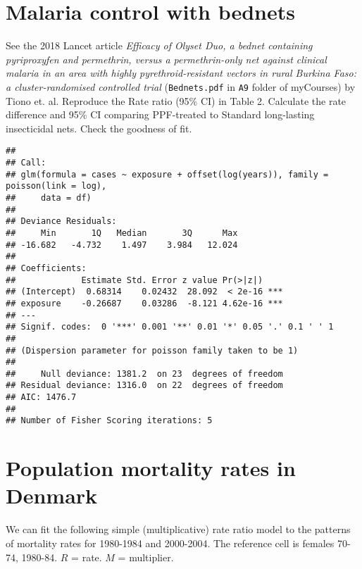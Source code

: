 \documentclass[landscape,twocolumn,letterpaper,9pt,reqno]{article}\usepackage[]{graphicx}\usepackage[]{color}
\newenvironment{knitrout}{}{} %
\begin{document}
	


\section{Malaria control with bednets}

See the 2018 Lancet article \textit{Efficacy of Olyset Duo, a bednet containing pyriproxyfen and permethrin, versus a permethrin-only net against clinical malaria in an area with highly pyrethroid-resistant vectors in rural Burkina Faso: a cluster-randomised
	controlled trial} (\texttt{Bednets.pdf} in \texttt{A9} folder of myCourses) by Tiono et. al. Reproduce the Rate ratio (95\% CI) in Table 2. Calculate the rate difference and 95\% CI comparing PPF-treated to Standard long-lasting insecticidal nets. Check the goodness of fit. 




\begin{knitrout}
\color{fgcolor}
\begin{verbatim}
## 
## Call:
## glm(formula = cases ~ exposure + offset(log(years)), family = poisson(link = log), 
##     data = df)
## 
## Deviance Residuals: 
##     Min       1Q   Median       3Q      Max  
## -16.682   -4.732    1.497    3.984   12.024  
## 
## Coefficients:
##             Estimate Std. Error z value Pr(>|z|)    
## (Intercept)  0.68314    0.02432  28.092  < 2e-16 ***
## exposure    -0.26687    0.03286  -8.121 4.62e-16 ***
## ---
## Signif. codes:  0 '***' 0.001 '**' 0.01 '*' 0.05 '.' 0.1 ' ' 1
## 
## (Dispersion parameter for poisson family taken to be 1)
## 
##     Null deviance: 1381.2  on 23  degrees of freedom
## Residual deviance: 1316.0  on 22  degrees of freedom
## AIC: 1476.7
## 
## Number of Fisher Scoring iterations: 5
\end{verbatim}

\end{knitrout}
	




\clearpage


\section{Population mortality rates in Denmark}
\small 

\vspace*{-.1in}

We can fit the following simple (multiplicative) rate ratio model to the 
patterns of mortality rates  for 1980-1984 and  2000-2004. The reference cell is females 70-74,   1980-84. $R$ = rate. $M$ = multiplier.
\end{document}
